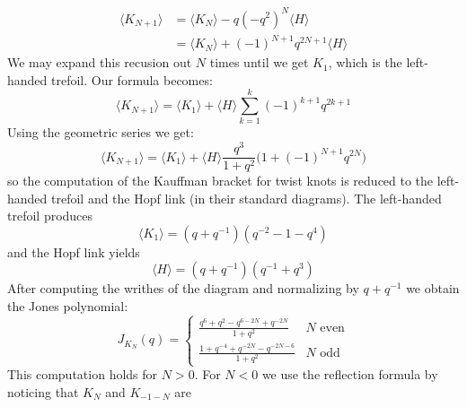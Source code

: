             \begin{align}
                \langle{K_{N+1}}\rangle
                &=\langle{K_{N}}\rangle
                -q(-q^{2})^{N}\langle{H}\rangle\\
                &=\langle{K_{N}}\rangle
                +(-1)^{N+1}q^{2N+1}\langle{H}\rangle
            \end{align}
            We may expand this recusion out $N$ times until we get $K_{1}$,
            which is the left-handed trefoil. Our formula becomes:
            \begin{equation}
                \langle{K_{N+1}}\rangle
                =\langle{K_{1}}\rangle
                +\langle{H}\rangle
                \sum_{k=1}^{k}(-1)^{k+1}q^{2k+1}
            \end{equation}
            Using the geometric series we get:
            \begin{equation}
                \langle{K_{N+1}}\rangle
                =\langle{K_{1}}\rangle+\langle{H}\rangle
                \frac{q^{3}}{1+q^{2}}\big(1+(-1)^{N+1}q^{2N}\big)
            \end{equation}
            so the computation of the Kauffman bracket for twist knots is
            reduced to the left-handed trefoil and the Hopf link (in their
            standard diagrams). The left-handed trefoil produces
            \begin{equation}
                \langle{K_{1}}\rangle=(q+q^{-1})(q^{-2}-1-q^{4})
            \end{equation}
            and the Hopf link yields
            \begin{equation}
                \langle{H}\rangle=
                (q+q^{-1})(q^{-1}+q^{3})
            \end{equation}
            After computing the writhes of the diagram and normalizing
            by $q+q^{-1}$ we obtain the Jones polynomial:
            \begin{equation}
                J_{K_{N}}(q)
                =\begin{cases}
                    \frac{q^{6}+q^{2}-q^{6-2N}+q^{-2N}}{1+q^{2}}
                    &N\textrm{ even}\\
                    \frac{1+q^{-4}+q^{-2N}-q^{-2N-6}}{1+q^{2}}
                    &N\textrm{ odd}
                \end{cases}
            \end{equation}
            This computation holds for $N>0$. For $N<0$ we use the
            reflection formula by noticing that $K_{N}$ and $K_{-1-N}$ are
